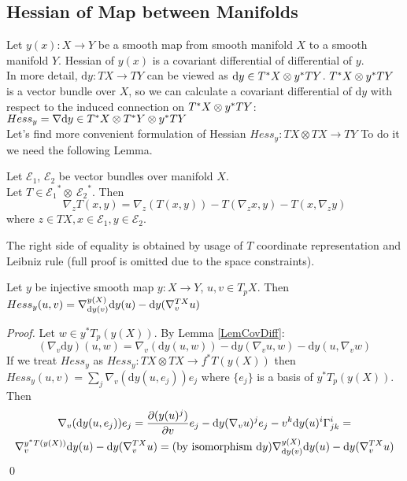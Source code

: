 \documentclass{llncs}
\newcommand{\partderiv}[2]{\frac{\partial #1}{\partial #2}}
\newcommand{\CovariantDerivManif}[2]{\tensor*{\nabla}{^{#1}_{#2}}}
\newcommand{\CovariantDiff}{\nabla}
\newcommand{\CovariantDeriv}[1]{\nabla_{#1}}
\newcommand{\Diff}{\mathrm{d}}
\newcommand{\TangentSpaceP}[1]{{T_p}{#1}}
\newcommand{\TangentBundle}[1]{T{#1}}
\newcommand{\CotangentBundle}[1]{\tensor*{T}{^{*}}{#1}}
\newcommand {\Preimage}[2]{{#2}^*{#1}}
\newcommand \TpPreimage[2]{\Preimage{\TangentSpaceP{#1}}{#2}}
\newcommand \TPreimage[2]{\Preimage{\TangentBundle{#1}}{#2}}
\newcommand {\DiffSpace}[3]{\CotangentBundle{#1}\otimes \TPreimage{#2}{#3}}
\newcommand {\HessianSpace}[3]{\CotangentBundle{#1}\otimes \CotangentBundle{#2}\otimes \TPreimage{#2}{#3}}
\newcommand {\bigeps}{\mathcal{E}}
\begin{document}
\subsection{Hessian of Map between Manifolds}
Let $y(x):X\to Y$ be a smooth map from smooth manifold $X$ to a smooth manifold $Y$. Hessian of $y(x)$ is a covariant differential of differential of $y$.
\\
In more detail, $\Diff y:TX\to TY$ can be viewed as $\Diff y \in \DiffSpace{X}{Y}{y}$.
$\DiffSpace{X}{Y}{y}$ is a vector bundle over $X$, so we can calculate a covariant differential of $\Diff y$ with respect to the induced connection on $\DiffSpace{X}{Y}{y}$: $Hess_y=\CovariantDiff \Diff y \in \HessianSpace{X}{Y}{y}$
\\
Let's find more convenient formulation of Hessian $Hess_y:\TangentBundle{X}\otimes\TangentBundle{X}\to \TangentBundle{Y}$
To do it we need the following Lemma.
\begin{lemma} \label{LemCovDiff}
Let $\bigeps_1$, $\bigeps_2$ be vector bundles over manifold $X$. 
\\
Let $T \in {\bigeps_1}^* \otimes \ {\bigeps_2}^*$. Then
$$\CovariantDeriv{z}{T}(x, y) = \CovariantDeriv{z}{(T(x, y))} -
T(\CovariantDeriv{z}{x}, y) - T(x, \CovariantDeriv{z}{y})$$
where $z \in TX, x \in \bigeps_1, y \in \bigeps_2$. 
\end{lemma}
The right side of equality is obtained by usage of $T$ coordinate representation and Leibniz rule (full proof is omitted due to the space constraints).

\begin{lemma}
Let $y$ be injective smooth map $y:X\to Y$, $u, v\in T_p X$. Then
$Hess_y(u,v)=\CovariantDerivManif{y(X)}{ \Diff y(v)} \Diff y(u) - 
							\Diff y( 
							\CovariantDerivManif{\TangentBundle{X}}{v}u
							)$
\end{lemma}
\begin{proof}
Let $w\in \TpPreimage{(y(X))}{y}$. By Lemma \ref{LemCovDiff}: 
$$(\CovariantDeriv{v} \Diff y)(u, w) = \CovariantDeriv{v}{(\Diff y(u, w))} - \Diff y(\CovariantDeriv{v}{u}, w) - \Diff y({u}, \CovariantDeriv{v}{w})$$
If we treat $Hess_y$ as $Hess_y:\TangentBundle{X}\otimes\TangentBundle{X}\to \TPreimage{(y(X))}{f}$ 
then $Hess_y(u, v)= \sum_{j} \CovariantDeriv{v}{(\Diff y(u, e_j))} e_j$ where $\{e_j\}$ is a basis of $\TpPreimage{(y(X))}{y}$. Then
\begin{multline}
\CovariantDeriv{v}{(\Diff y(u, e_j))} e_j = \partderiv{(y(u)^j)}{v} e_j - \Diff y(\CovariantDeriv{v}{u})^j e_j - v^k \Diff y(u)^i \tensor*{\Gamma}{^i_j_k}= 
\\ 
\CovariantDerivManif{\TPreimage{(y(X))}{y}}{ v} \Diff y(u) - 
							\Diff y( 
							\CovariantDerivManif{\TangentBundle{X}}{v}u
							) = 
							(\textrm{by isomorphism } \Diff y) \CovariantDerivManif{y(X)}{ \Diff y(v)} \Diff y(u) - 
							\Diff y( 
							\CovariantDerivManif{\TangentBundle{X}}{v}u )
\end{multline}
\qed 
\end{proof}
\end{document}
